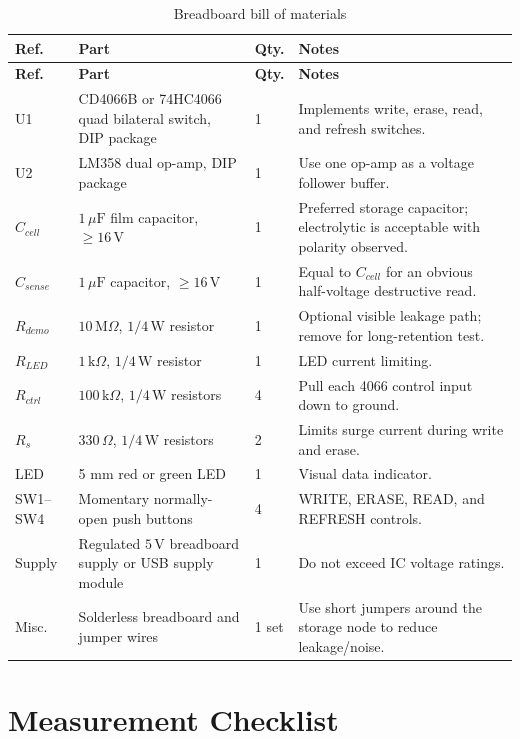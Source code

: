 \documentclass[12pt,a4paper]{report}
\begin{document}
\begin{longtable}{@{}>{\raggedright\arraybackslash}p{}p{}p{}p{}@{}}
\caption{Breadboard bill of materials}\label{tab:bom}\\
\toprule
\textbf{Ref.} & \textbf{Part} & \textbf{Qty.} & \textbf{Notes} \\
\midrule
\endfirsthead
\toprule
\textbf{Ref.} & \textbf{Part} & \textbf{Qty.} & \textbf{Notes} \\
\midrule
\endhead
U1 & CD4066B or 74HC4066 quad bilateral switch, DIP package & 1 & Implements write, erase, read, and refresh switches. \\
U2 & LM358 dual op-amp, DIP package & 1 & Use one op-amp as a voltage follower buffer. \\
$C_{cell}$ & $1\,\mu\mathrm{F}$ film capacitor, $\ge 16\,\mathrm{V}$ & 1 & Preferred storage capacitor; electrolytic is acceptable with polarity observed. \\
$C_{sense}$ & $1\,\mu\mathrm{F}$ capacitor, $\ge 16\,\mathrm{V}$ & 1 & Equal to $C_{cell}$ for an obvious half-voltage destructive read. \\
$R_{demo}$ & $10\,\mathrm{M}\Omega$, $1/4\,\mathrm{W}$ resistor & 1 & Optional visible leakage path; remove for long-retention test. \\
$R_{LED}$ & $1\,\mathrm{k}\Omega$, $1/4\,\mathrm{W}$ resistor & 1 & LED current limiting. \\
$R_{ctrl}$ & $100\,\mathrm{k}\Omega$, $1/4\,\mathrm{W}$ resistors & 4 & Pull each 4066 control input down to ground. \\
$R_s$ & $330\,\Omega$, $1/4\,\mathrm{W}$ resistors & 2 & Limits surge current during write and erase. \\
LED & 5 mm red or green LED & 1 & Visual data indicator. \\
SW1--SW4 & Momentary normally-open push buttons & 4 & WRITE, ERASE, READ, and REFRESH controls. \\
Supply & Regulated $5\,\mathrm{V}$ breadboard supply or USB supply module & 1 & Do not exceed IC voltage ratings. \\
Misc. & Solderless breadboard and jumper wires & 1 set & Use short jumpers around the storage node to reduce leakage/noise. \\
\bottomrule
\end{longtable}

\section{Measurement Checklist}
\end{document}
